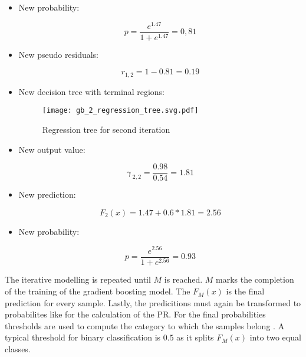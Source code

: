 \begin{itemize}

    \item New probability:

    \begin{equation*}
        p = \frac{e^{1.47}}{1 + e^{1.47}} = 0,81
    \end{equation*}

    \item New pseudo residuals: 

    \begin{equation*}
        r_{1, 2} = 1 - 0.81 = 0.19
    \end{equation*}
    
    \item New decision tree with terminal regions:

    \begin{figure}[H]
        \centering
        \caption[]{Regression tree for second iteration}
        \label{gb_2_regression_tree}
        \texttt{[image: gb\_2\_regression\_tree.svg.pdf]}
    \end{figure}

    \item New output value: 

    \begin{equation*}
        \gamma_{\;2,2} = \frac{0.98}{0.54} = 1.81 
    \end{equation*}

    \item New prediction:

    \begin{equation*}
        F_{2}(x) = 1.47 + 0.6 * 1.81 = 2.56
    \end{equation*}

    \item New probability:

    \begin{equation*}
        p = \frac{e^{2.56}}{1 + e^{2.56}} = 0.93 
    \end{equation*}

\end{itemize}

The iterative modelling is repeated until \(M\) is reached. \(M\) marks the completion of the training of the gradient 
boosting model. The \(F_{M}(x)\) is the final prediction for every sample. Lastly, the predicitions
must again be transformed to probabilites like for the calculation of the \ac{PR}. For the final probabilities 
thresholds are used to compute the category to which the samples belong \cite[p.1204]{Friedman_2001}. A typical threshold 
for binary classification is \(0.5\) as it splits \(F_{M}(x)\) into two equal classes.

